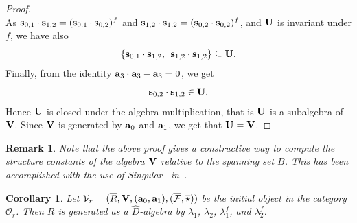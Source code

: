 \documentclass[a4paper]{amsart}
\newtheorem{remark}[lemma]{Remark}
\newtheorem{cor}[lemma]{Corollary}
\newcommand{\Ro}{{\overline R}}
\newcommand{\Vo}{{\bf V}}
\newcommand{\ba}{{\bf a}}
\newcommand{\bs}{{\bf s}}
\begin{document}
\begin{proof}
\begin{equation}
\end{equation}
 As  $ \bs_{0,1}\cdot \bs_{1,2}=(\bs_{0,1}\cdot \bs_{0,2})^f$ and  $\bs_{1,2}\cdot \bs_{1,2}=(\bs_{0,2}\cdot \bs_{0,2})^f$, and  $\bf U$ is invariant under $f$,  we have also 
 \begin{equation}
 \{\bs_{0,1}\cdot \bs_{1,2},\:\:  \bs_{1,2}\cdot \bs_{1,2}\}\subseteq  \bf U.
 \end{equation}  
 Finally, from the identity $\ba_3\cdot \ba_3-\ba_3=0$, we get 
 $$ \bs_{0,2}\cdot \bs_{1,2} \in \bf U.
 $$ 
 Hence $\bf U$ is closed under the algebra multiplication, that is $\bf U$ is a subalgebra of $\Vo$. Since $\Vo$ is generated by $\ba_0$ and $\ba_1$, we get that $\bf U=\Vo$. \end{proof}

\begin{remark}\label{struct}
Note that the above proof gives a constructive way to compute the structure constants of the algebra $\Vo$ relative to the spanning set $B$. This has been accomplished with the use of Singular~\cite{Singular} in~\cite[genericsakuma.s]{code}.
\end{remark}

\begin{cor}\label{Rin}
Let $\mathcal V_r=(\Ro,\Vo, (\ba_0, \ba_1), (\overline{\mathcal F}, \overline \star))$  be the initial object in the category $\mathcal O_r$.
Then $\Ro$ is generated as a $\hat D$-algebra by $\lambda_1$, $\lambda_2$,  $\lambda_1^f$, and $\lambda_2^f$.\\
\end{cor}
\end{document}
